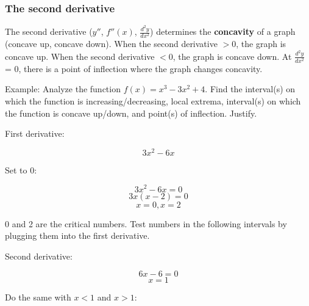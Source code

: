 \documentclass[letterpaper, 12pt]{article}
\begin{document}
\subsubsection*{The second derivative}
The second derivative ($y''$, $f''(x)$, $\displaystyle\frac{d^2y}{dx^2}$) determines the \textbf{concavity} of a graph (concave up, concave down). When the second derivative $>$0, the graph is concave up. When the second derivative $<$0, the graph is concave down. At $\displaystyle\frac{d^2y}{dx^2}$ = 0, there is a point of inflection where the graph changes concavity.

Example: Analyze the function 
$\displaystyle f(x) = x^3-3x^2+4$.
Find the interval(s) on which the function is increasing/decreasing, local extrema, interval(s) on which the function is concave up/down, and point(s) of inflection. Justify.

First derivative:

$$3x^2 - 6x$$

Set to 0:

$$ 3x^2-6x = 0$$
$$ 3x(x-2) = 0$$
$$ x = 0, x = 2$$

0 and 2 are the critical numbers. Test numbers in the following intervals by plugging them into the first derivative.

\begin{center}
\end{center}

Second derivative:

$$6x - 6 = 0$$
$$ x = 1$$

Do the same with $x<1$ and $x>1$:

\begin{center}
\end{center}
\end{document}
